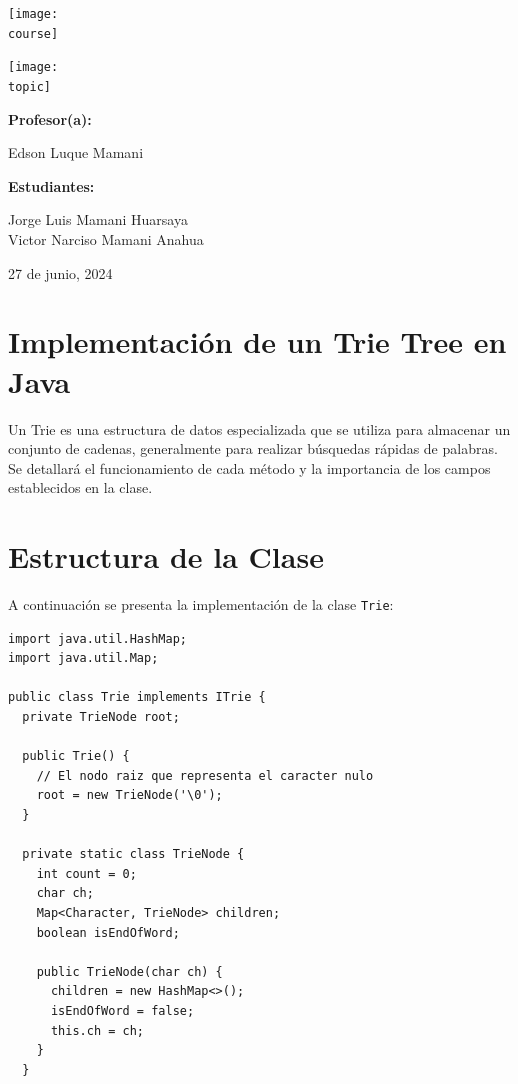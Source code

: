 \documentclass[11pt, a4paper]{article}
\newcommand{\course}{img/data_structures.png}
\newcommand{\topic}{img/trie_tree.png}
\newcommand{\professor}{Edson Luque Mamani}
\newcommand{\students}{Jorge Luis Mamani Huarsaya\\Victor Narciso Mamani Anahua}
\newcommand{\mydate}{27 de junio, 2024}
\begin{document}
\begin{titlepage}
	\centering
	\texttt{[image: \\course]} \par
  \vfill \vfill
	\texttt{[image: \\topic]}\par
  \vfill \vfill
  {\textbf{Profesor(a):} \par}
	\professor \vfill
  {\textbf{Estudiantes:} \par}
	\students \vfill
	{\large \mydate \par}
\end{titlepage}

\section{Implementación de un Trie Tree en Java}
Un Trie es una estructura de datos especializada que se utiliza para almacenar un conjunto de cadenas, generalmente para realizar búsquedas rápidas de palabras. Se detallará el funcionamiento de cada método y la importancia de los campos establecidos en la clase.

\section{Estructura de la Clase}
A continuación se presenta la implementación de la clase \texttt{Trie}:

\begin{verbatim}
import java.util.HashMap;
import java.util.Map;

public class Trie implements ITrie {
  private TrieNode root;

  public Trie() {
    // El nodo raiz que representa el caracter nulo
    root = new TrieNode('\0');
  }

  private static class TrieNode {
    int count = 0;
    char ch;
    Map<Character, TrieNode> children;
    boolean isEndOfWord;

    public TrieNode(char ch) {
      children = new HashMap<>();
      isEndOfWord = false;
      this.ch = ch;
    }
  }
\end{verbatim}
\end{document}

